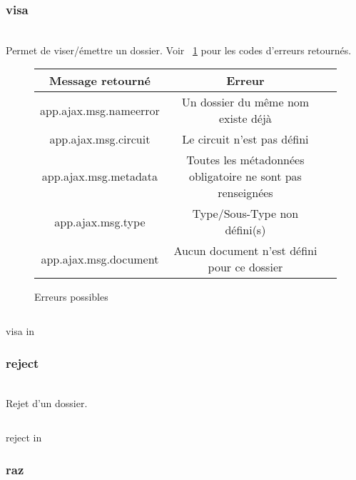 \subsubsection{visa}
\\

Permet de viser/émettre un dossier. Voir ~\ref{table:possible_error} pour les codes d'erreurs retournés.

\begin{figure}
	\begin{center}
        \begin{tabular}{c|c|c}
	        \hline
	        Message retourné & Erreur \\
	        \hline
	        app.ajax.msg.nameerror & Un dossier du même nom existe déjà \\
	        app.ajax.msg.circuit & Le circuit n'est pas défini\\
	        app.ajax.msg.metadata & Toutes les métadonnées obligatoire ne sont pas renseignées\\
	        app.ajax.msg.type & Type/Sous-Type non défini(s)\\
	        app.ajax.msg.document & Aucun document n'est défini pour ce dossier\\
        \end{tabular}
    \end{center}
    \caption{Erreurs possibles}
    \label{table:possible_error}
\end{figure}

\begin{codesnippet}
\inputminted[frame=single,linenos,fontsize=\footnotesize]{javascript}{extraits/visa_in.js}
\caption{visa in}
\label{snip:visa_in}
\end{codesnippet}


\subsubsection{reject}
\\

Rejet d'un dossier.

\begin{codesnippet}
\inputminted[frame=single,linenos,fontsize=\footnotesize]{javascript}{extraits/reject_in.js}
\caption{reject in}
\label{snip:reject_in}
\end{codesnippet}


\subsubsection{raz}
\\

